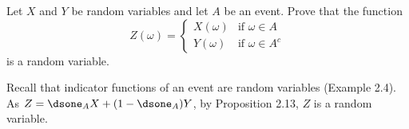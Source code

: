 \begin{exercise}
  Let $X$ and $Y$ be random variables and let $A$ be an event. Prove that the function
  \[
    Z(\omega) = \begin{cases}
      X(\omega) & \mbox{if } \omega\in A \\
      Y(\omega) & \mbox{if } \omega\in A^c
    \end{cases}
  \]
  is a random variable.
\end{exercise}
\begin{solution}
  Recall that indicator functions of an event are random variables (Example 2.4). As $Z = \dsone_A X + (1-\dsone_A) Y$, by Proposition 2.13, $Z$ is a random variable.
\end{solution}

